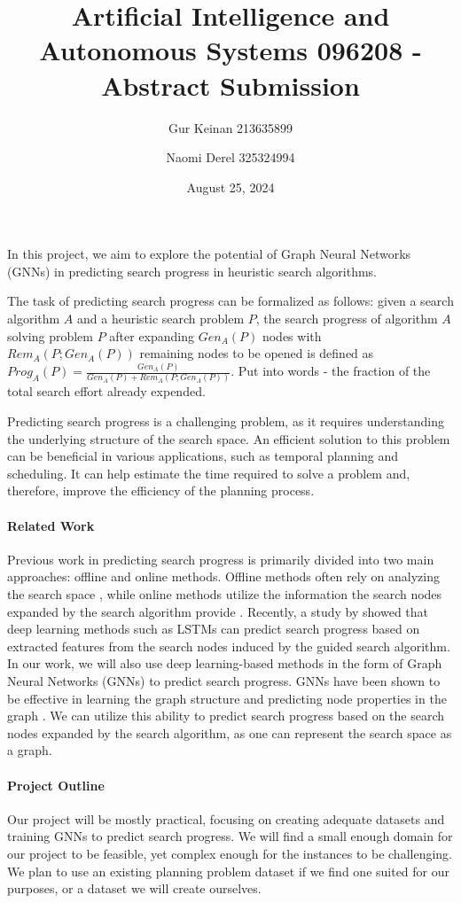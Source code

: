 \documentclass[12pt]{article}
\title{Artificial Intelligence and Autonomous Systems 096208 - Abstract Submission}
\author{Gur Keinan 213635899 \and Naomi Derel 325324994}
\date{August 25, 2024}
\begin{document}
\maketitle

In this project, we aim to explore the potential of Graph Neural Networks (GNNs) in predicting search progress in heuristic search algorithms. 

The task of predicting search progress can be formalized as follows: given a search algorithm $A$ and a heuristic search problem $P$, the search progress of algorithm $A$ solving problem $P$ after expanding $Gen_A(P)$ nodes with $Rem_A(P; Gen_A(P))$ remaining nodes to be opened is defined as $Prog_A(P) = \frac{Gen_A(P)}{Gen_A(P) + Rem_A(P; Gen_A(P))}$. 
Put into words - the fraction of the total search effort already expended. 

Predicting search progress is a challenging problem, as it requires understanding the underlying structure of the search space.
An efficient solution to this problem can be beneficial in various applications, such as temporal planning and scheduling. It can help estimate the time required to solve a problem and, therefore, improve the efficiency of the planning process.

\paragraph{Related Work} Previous work in predicting search progress is primarily divided into two main approaches: offline and online methods. Offline methods often rely on analyzing the search space \citep{breyer2008recent}, while online methods utilize the information the search nodes expanded by the search algorithm provide \citep{thayer2012we}.
Recently, a study by \citet{sudry2022learning} showed that deep learning methods such as LSTMs can predict search progress based on extracted features from the search nodes induced by the guided search algorithm. In our work, we will also use deep learning-based methods in the form of Graph Neural Networks (GNNs) to predict search progress. GNNs have been shown to be effective in learning the graph structure and predicting node properties in the graph \citep{wu2020comprehensive, scarselli2008graph}. We can utilize this ability to predict search progress based on the search nodes expanded by the search algorithm, as one can represent the search space as a graph.

\paragraph{Project Outline} Our project will be mostly practical, focusing on creating adequate datasets and training GNNs to predict search progress. We will find a small enough domain for our project to be feasible, yet complex enough for the instances to be challenging. We plan to use an existing planning problem dataset if we find one suited for our purposes, or a dataset we will create ourselves. 
\end{document}

